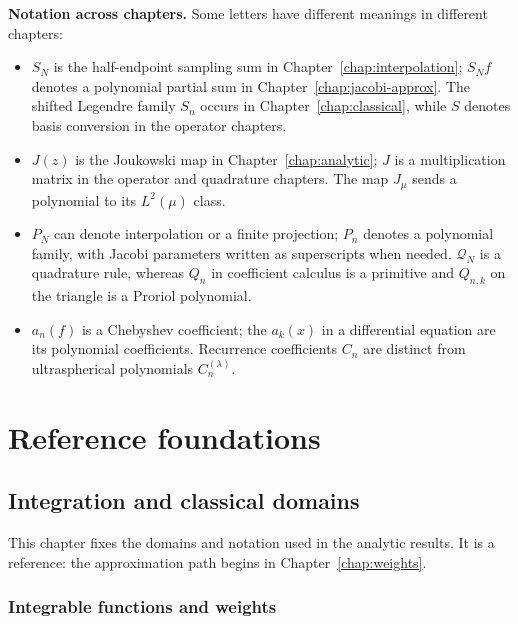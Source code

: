 \textbf{Notation across chapters.} Some letters have different meanings in
different chapters:
\begin{itemize}
\item $S_N$ is the half-endpoint sampling sum in
  Chapter~\ref{chap:interpolation}; $S_Nf$ denotes a polynomial partial sum in
  Chapter~\ref{chap:jacobi-approx}. The shifted Legendre family $S_n$ occurs in
  Chapter~\ref{chap:classical}, while $S$ denotes basis conversion in the
  operator chapters.
\item $J(z)$ is the Joukowski map in Chapter~\ref{chap:analytic}; $J$ is a
  multiplication matrix in the operator and quadrature chapters. The map
  $J_\mu$ sends a polynomial to its $L^2(\mu)$ class.
\item $P_N$ can denote interpolation or a finite projection; $P_n$ denotes a
  polynomial family, with Jacobi parameters written as superscripts when
  needed. $\mathcal Q_N$ is a quadrature rule, whereas $Q_n$ in coefficient
  calculus is a primitive and $Q_{n,k}$ on the triangle is a Proriol polynomial.
\item $a_n(f)$ is a Chebyshev coefficient; the $a_k(x)$ in a differential
  equation are its polynomial coefficients. Recurrence coefficients $C_n$
  are distinct from ultraspherical polynomials $C_n^{(\lambda)}$.
\end{itemize}

\part{Reference foundations}\label{part:foundations}
\chapter{Integration and classical domains}\label{chap:foundations}


This chapter fixes the domains and notation used in the analytic results. It is a reference: the approximation path begins in Chapter~\ref{chap:weights}.

\section{Integrable functions and weights}\label{sec:textbook-foundations-integrals}

